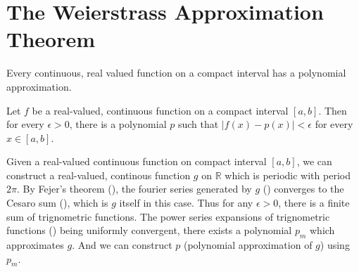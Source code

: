\section{The Weierstrass Approximation Theorem}
	Every continuous, real valued function on a compact interval has a polynomial approximation.\cite[Theorem 11.17]{apostol}
	\begin{theorem}[Weierstrass]
		Let $f$ be a real-valued, continuous function on a compact interval $[a,b]$. Then for every $\epsilon > 0$, there is a polynomial $p$ such that $|f(x)-p(x)| < \epsilon$ for every $x \in [a,b]$.
	\end{theorem}
	\begin{synopsis}
		Given a real-valued continuous function on compact interval $[a,b]$, we can construct a real-valued, continous function $g$ on $\mathbb{R}$ which is periodic with period $2\pi$. By Fejer's theorem (\cite[Theorem 11.15]{apostol}), the fourier series generated by $g$ (\cite[definition 11.3]{apostol}) converges to the Cesaro sum (\cite[Definition 8.47]{apostol}), which is $g$ itself in this case. Thus for any $\epsilon > 0$, there is a finite sum of trignometric functions. The power series expansions of trignometric functions (\cite[definition 9.27]{apostol}) being uniformly convergent, there exists a polynomial $p_m$ which approximates $g$. And we can construct $p$ (polynomial approximation of $g$) using $p_m$.
	\end{synopsis}
